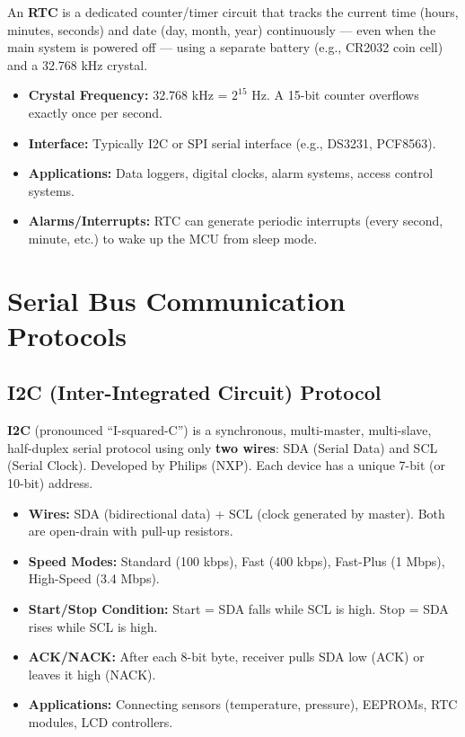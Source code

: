 \documentclass[12pt,a4paper]{article}
\begin{document}
\begin{tcolorbox}[defbox, title={\textbf{Real-Time Clock (RTC)}}]
An \textbf{RTC} is a dedicated counter/timer circuit that tracks the current time (hours, minutes, seconds) and date (day, month, year) continuously --- even when the main system is powered off --- using a separate battery (e.g., CR2032 coin cell) and a 32.768 kHz crystal.
\end{tcolorbox}

\begin{itemize}[leftmargin=*, itemsep=3pt]
  \item \textbf{Crystal Frequency:} 32.768 kHz = $2^{15}$ Hz. A 15-bit counter overflows exactly once per second.
  \item \textbf{Interface:} Typically I2C or SPI serial interface (e.g., DS3231, PCF8563).
  \item \textbf{Applications:} Data loggers, digital clocks, alarm systems, access control systems.
  \item \textbf{Alarms/Interrupts:} RTC can generate periodic interrupts (every second, minute, etc.) to wake up the MCU from sleep mode.
\end{itemize}

\section{Serial Bus Communication Protocols}

\subsection{I2C (Inter-Integrated Circuit) Protocol}

\begin{tcolorbox}[defbox, title={\textbf{I2C Protocol}}]
\textbf{I2C} (pronounced ``I-squared-C'') is a synchronous, multi-master, multi-slave, half-duplex serial protocol using only \textbf{two wires}: SDA (Serial Data) and SCL (Serial Clock). Developed by Philips (NXP). Each device has a unique 7-bit (or 10-bit) address.
\end{tcolorbox}

\begin{itemize}[leftmargin=*, itemsep=3pt]
  \item \textbf{Wires:} SDA (bidirectional data) + SCL (clock generated by master). Both are open-drain with pull-up resistors.
  \item \textbf{Speed Modes:} Standard (100 kbps), Fast (400 kbps), Fast-Plus (1 Mbps), High-Speed (3.4 Mbps).
  \item \textbf{Start/Stop Condition:} Start = SDA falls while SCL is high. Stop = SDA rises while SCL is high.
  \item \textbf{ACK/NACK:} After each 8-bit byte, receiver pulls SDA low (ACK) or leaves it high (NACK).
  \item \textbf{Applications:} Connecting sensors (temperature, pressure), EEPROMs, RTC modules, LCD controllers.
\end{itemize}
\end{document}
